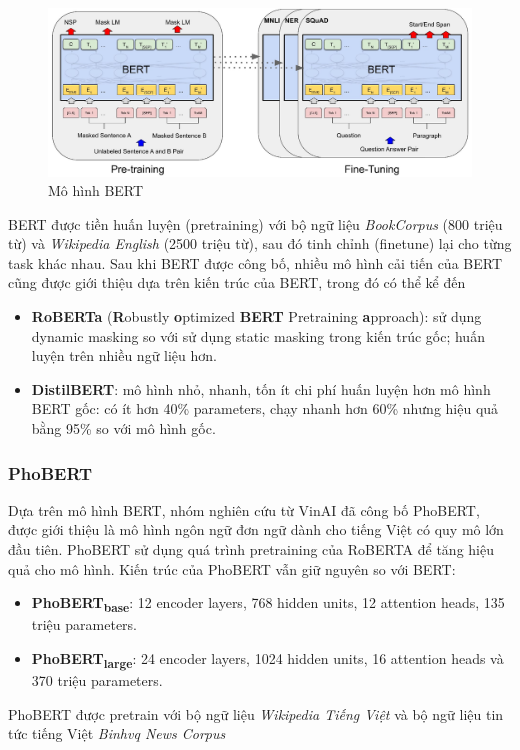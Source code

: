 \begin{figure}
\centering
\includegraphics[scale=.65]{img/BERT.jpg}
\caption{Mô hình BERT\cite{devlin-etal-2019-bert}}
\label{fig:my_label}
\end{figure}
BERT được tiền huấn luyện (pretraining) với bộ ngữ liệu \textit{BookCorpus} (800 triệu từ) và \textit{Wikipedia English} (2500 triệu từ), sau đó tinh chỉnh (finetune) lại cho từng task khác nhau. Sau khi BERT được công bố, nhiều mô hình cải tiến của BERT cũng được giới thiệu dựa trên kiến trúc của BERT, trong đó có thể kể đến
\begin{itemize}
\item \textbf{RoBERTa} (\textbf{R}obustly \textbf{o}ptimized \textbf{BERT} Pretraining \textbf{a}pproach)\cite{DBLP:journals/corr/abs-1907-11692}: sử dụng dynamic masking so với sử dụng static masking trong kiến trúc gốc; huấn luyện trên nhiều ngữ liệu hơn.
\item \textbf{DistilBERT}\cite{DBLP:journals/corr/abs-1910-01108}: mô hình nhỏ, nhanh, tốn ít chi phí huấn luyện hơn mô hình BERT gốc: có ít hơn 40\% parameters, chạy nhanh hơn 60\% nhưng hiệu quả bằng 95\% so với mô hình gốc.
\end{itemize}

\subsubsection{PhoBERT}
Dựa trên mô hình BERT, nhóm nghiên cứu từ VinAI đã công bố PhoBERT\cite{phobert}, được giới thiệu là mô hình ngôn ngữ đơn ngữ dành cho tiếng Việt có quy mô lớn đầu tiên. PhoBERT sử dụng quá trình pretraining của RoBERTA để tăng hiệu quả cho mô hình. Kiến trúc của PhoBERT vẫn giữ nguyên so với BERT:
\begin{itemize}
\item \textbf{PhoBERT\textsubscript{base}}: 12 encoder layers, 768 hidden units, 12 attention heads, 135 triệu parameters.
\item \textbf{PhoBERT\textsubscript{large}}: 24 encoder layers, 1024 hidden units, 16 attention heads và 370 triệu parameters.
\end{itemize}
PhoBERT được pretrain với bộ ngữ liệu \textit{Wikipedia Tiếng Việt} và bộ ngữ liệu tin tức tiếng Việt \textit{Binhvq News Corpus}

